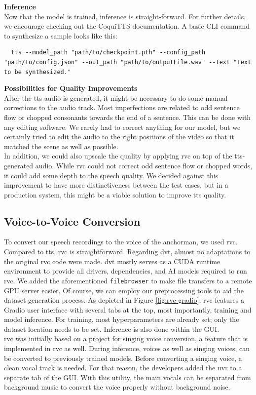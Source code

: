 \documentclass[
  a4paper,  %
  twoside,  %
  bibliography=totoc,
  headsepline,
  cleardoublepage=empty,
  parskip=half,
  draft=false
]{scrbook}
\begin{document}
\textbf{Inference} \\
Now that the model is trained, inference is straight-forward. For further details, we encourage checking out the CoquiTTS documentation. A basic CLI command to synthesize a sample looks like this:
\begin{lstlisting}
  tts --model_path "path/to/checkpoint.pth" --config_path "path/to/config.json" --out_path "path/to/outputFile.wav" --text "Text to be synthesized."
\end{lstlisting}

\textbf{Possibilities for Quality Improvements} \\
After the \gls{tts} audio is generated, it might be necessary to do some manual corrections to the audio track. Most imperfections are related to odd sentence flow or chopped consonants towards the end of a sentence. This can be done with any editing software. We rarely had to correct anything for our model, but we certainly tried to edit the audio to the right positions of the video so that it matched the scene as well as possible. \\
In addition, we could also upscale the quality by applying \gls{rvc} on top of the \gls{tts}-generated audio. While \gls{rvc} could not correct odd sentence flow or chopped words, it could add some depth to the speech quality. We decided against this improvement to have more distinctiveness between the test cases, but in a production system, this might be a viable solution to improve \gls{tts} quality. 

\subsection{Voice-to-Voice Conversion}
To convert our speech recordings to the voice of the anchorman, we used \gls{rvc}. Compared to \gls{tts}, \gls{rvc} is straightforward. Regarding \gls*{dvt}, almost no adaptations to the original \gls*{rvc} \cite*{RVCProjectRetrievalbasedVoiceConversionWebUI2023} code were made. \gls*{dvt} mostly serves as a CUDA runtime environment to provide all drivers, dependencies, and AI models required to run \gls{rvc}. We added the aforementioned \verb|filebrowser| to make file transfers to a remote GPU server easier. Of course, we can employ our preprocessing tools to aid the dataset generation process. As depicted in Figure \ref{fig:rvc-gradio}, \gls{rvc} features a Gradio user interface with several tabs at the top, most importantly, training and model inference. For training, most hyperparameters are already set; only the dataset location needs to be set. Inference is also done within the GUI. \\
\gls{rvc} was initially based on a project for singing voice conversion, a feature that is implemented in \gls{rvc} as well. During inference, voices as well as singing voices, can be converted to previously trained models. Before converting a singing voice, a clean vocal track is needed. For that reason, the developers added the \gls{uvr} to a separate tab of the GUI. With this utility, the main vocals can be separated from background music to convert the voice properly without background noise.
\end{document}
